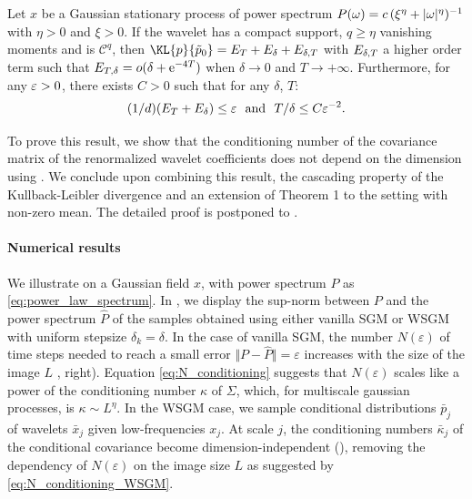 \documentclass{article}
\begin{document}
\begin{theorem}
  \label{lemma:bound_spectrum}
  Let $x$ be a Gaussian stationary process of power spectrum
  $P({\omega}) = c\,(\xi^\eta + |{\omega}|^\eta)^{-1}$ with $\eta > 0$ and $\xi > 0$.
  If the wavelet has a compact support, $q  \geq \eta$ vanishing moments and is ${\mathscr{C}}^q$, then 
  $\KL{p}{\tilde{p}_0} = \error_T + \error_{\delta} + \error_{\delta, T}$ with
  ${E}_{\delta, T}$ a higher order term such that $E_{T, \delta} = o(\delta + \mathrm{e}^{-4T})$ when $\delta \to 0$ and $T \to +\infty$. 
  Furthermore, for any $\varepsilon >0$, there exists $C > 0$ such that for any $\delta$, $T$:
  \begin{equation}
    \label{eq:N_conditioning_WSGM}
    (1/d) ({E}_T + {E}_\delta) \leq  \varepsilon~~\mbox{and}~~
    T/\delta \leq C \varepsilon^{-2}   .
  \end{equation}
\end{theorem}
To prove this result, we show that the conditioning number of the covariance matrix of the renormalized wavelet coefficients does not depend on the dimension using \citep{Meyer:92c}. We conclude upon combining this result, the cascading property of the Kullback-Leibler divergence and an extension of Theorem 1 to the setting with non-zero mean. The detailed proof is postponed to .

\paragraph{Numerical results}
We illustrate  on a Gaussian
field $x$, with power spectrum $P$ as \eqref{eq:power_law_spectrum}. In , we display the sup-norm between $P$ and
the power spectrum $\hat{P}$ of the samples obtained using either vanilla SGM or WSGM
with uniform stepsize $\delta_k = \delta$. In the case of vanilla SGM, the number $N(\varepsilon)$ of time steps needed to reach a small error $\Vert P - \hat{P} \Vert=\varepsilon$ increases with the size of the image $L$ , right). Equation \eqref{eq:N_conditioning} suggests that $N(\varepsilon)$ scales like a power of the conditioning number $\kappa$ of $\Sigma$, which, for multiscale gaussian processes, is $\kappa \sim L^\eta$. In the WSGM case, we sample conditional distributions $\bar{p}_j$ of wavelets $\bar{x}_j$  given low-frequencies $x_j$. At scale $j$, the conditioning numbers $\bar{\kappa}_j$ of the conditional covariance become dimension-independent (), removing the dependency of $N(\varepsilon)$ on the image size $L$ as suggested by \eqref{eq:N_conditioning_WSGM}.
\end{document}
